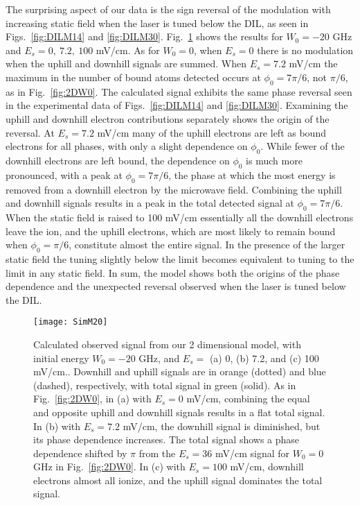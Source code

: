 \documentclass[aps,pra,reprint,groupedaddress]{revtex4-1}
\begin{document}
The surprising aspect of our data is the sign reversal of the modulation with increasing static field when the laser is tuned below the DIL, as seen in Figs.~\ref{fig:DILM14} and \ref{fig:DILM30}. Fig.~\ref{fig:2DW20} shows the results for $W_0 = -20$ GHz and $E_s = 0, ~7.2, ~100$ mV/cm. As for $W_0=0$, when $E_s=0$ there is no modulation when the uphill and downhill signals are summed. When $E_s= 7.2$ mV/cm the maximum in the number of bound atoms detected occurs at $\phi_0 = 7\pi/6$, not $\pi/6$, as in Fig.~\ref{fig:2DW0}. The calculated signal exhibits the same phase reversal seen in the experimental data of Figs.~\ref{fig:DILM14} and \ref{fig:DILM30}. Examining the uphill and downhill electron contributions separately shows the origin of the reversal. At $E_s = 7.2$ mV/cm many of the uphill electrons are left as bound electrons for all phases, with only a slight dependence on $\phi_0$. While fewer of the downhill electrons are left bound, the dependence on $\phi_0$ is much more pronounced, with a peak at $\phi_0=7\pi/6$, the phase at which the most energy is removed from a downhill electron by the microwave field. Combining the uphill and downhill signals results in a peak in the total detected signal at $\phi_0=7\pi/6$. When the static field is raised to 100 mV/cm essentially all the downhill electrons leave the ion, and the uphill electrons, which are most likely to remain bound when $\phi_0=\pi/6$, constitute almost the entire signal. In the presence of the larger static field the tuning slightly below the limit becomes equivalent to tuning to the limit in any static field. In sum, the model shows both the origins of the phase dependence and the unexpected reversal observed when the laser is tuned below the DIL.

\begin{figure}
	\texttt{[image: SimM20]}
	\caption{Calculated observed signal from our 2 dimensional model, with initial energy $W_0 = -20$ GHz, and $E_s =$ (a) 0, (b) 7.2, and (c) 100 mV/cm.. Downhill and uphill signals are in orange (dotted) and blue (dashed), respectively, with total signal in green (solid). As in Fig.~\ref{fig:2DW0}, in (a) with $E_s = 0$ mV/cm, combining the equal and opposite uphill and downhill signals results in a flat total signal. In (b) with $E_s = 7.2$ mV/cm, the downhill signal is diminished, but its phase dependence increases. The total signal shows a phase dependence shifted by $\pi$ from the $E_s=36$ mV/cm signal for $W_0 = 0$ GHz in Fig.~\ref{fig:2DW0}. In (c) with $E_s = 100$ mV/cm, downhill electrons almost all ionize, and the uphill signal dominates the total signal.}
	\label{fig:2DW20}
\end{figure}
\end{document}
